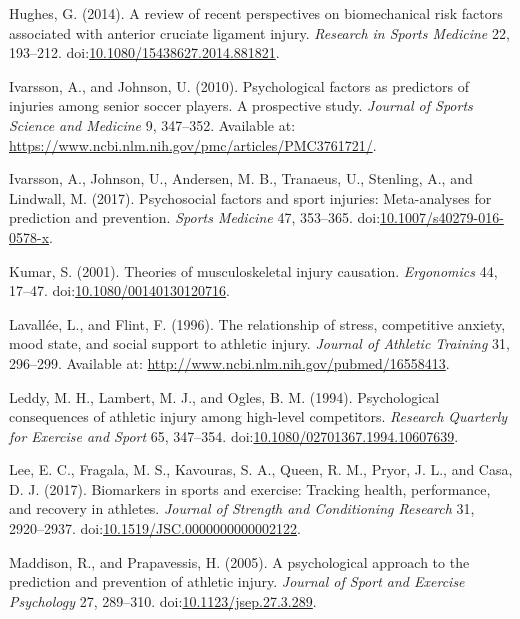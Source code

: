 \documentclass[utf8]{frontiersHLTH}
\begin{document}
\leavevmode\hypertarget{ref-Hughes2014}{}%
Hughes, G. (2014). A review of recent perspectives on biomechanical risk
factors associated with anterior cruciate ligament injury.
\emph{Research in Sports Medicine} 22, 193--212.
doi:\href{https://doi.org/10.1080/15438627.2014.881821}{10.1080/15438627.2014.881821}.

\leavevmode\hypertarget{ref-Ivarsson2010}{}%
Ivarsson, A., and Johnson, U. (2010). Psychological factors as
predictors of injuries among senior soccer players. A prospective study.
\emph{Journal of Sports Science and Medicine} 9, 347--352. Available at:
\url{https://www.ncbi.nlm.nih.gov/pmc/articles/PMC3761721/}.

\leavevmode\hypertarget{ref-Ivarsson2017}{}%
Ivarsson, A., Johnson, U., Andersen, M. B., Tranaeus, U., Stenling, A.,
and Lindwall, M. (2017). Psychosocial factors and sport injuries:
Meta-analyses for prediction and prevention. \emph{Sports Medicine} 47,
353--365.
doi:\href{https://doi.org/10.1007/s40279-016-0578-x}{10.1007/s40279-016-0578-x}.

\leavevmode\hypertarget{ref-Kumar2001}{}%
Kumar, S. (2001). Theories of musculoskeletal injury causation.
\emph{Ergonomics} 44, 17--47.
doi:\href{https://doi.org/10.1080/00140130120716}{10.1080/00140130120716}.

\leavevmode\hypertarget{ref-Lavallee1996}{}%
Lavallée, L., and Flint, F. (1996). The relationship of stress,
competitive anxiety, mood state, and social support to athletic injury.
\emph{Journal of Athletic Training} 31, 296--299. Available at:
\url{http://www.ncbi.nlm.nih.gov/pubmed/16558413}.

\leavevmode\hypertarget{ref-Leddy1994}{}%
Leddy, M. H., Lambert, M. J., and Ogles, B. M. (1994). Psychological
consequences of athletic injury among high-level competitors.
\emph{Research Quarterly for Exercise and Sport} 65, 347--354.
doi:\href{https://doi.org/10.1080/02701367.1994.10607639}{10.1080/02701367.1994.10607639}.

\leavevmode\hypertarget{ref-Lee2017}{}%
Lee, E. C., Fragala, M. S., Kavouras, S. A., Queen, R. M., Pryor, J. L.,
and Casa, D. J. (2017). Biomarkers in sports and exercise: Tracking
health, performance, and recovery in athletes. \emph{Journal of Strength
and Conditioning Research} 31, 2920--2937.
doi:\href{https://doi.org/10.1519/JSC.0000000000002122}{10.1519/JSC.0000000000002122}.

\leavevmode\hypertarget{ref-Maddison2005}{}%
Maddison, R., and Prapavessis, H. (2005). A psychological approach to
the prediction and prevention of athletic injury. \emph{Journal of Sport
and Exercise Psychology} 27, 289--310.
doi:\href{https://doi.org/10.1123/jsep.27.3.289}{10.1123/jsep.27.3.289}.
\end{document}
